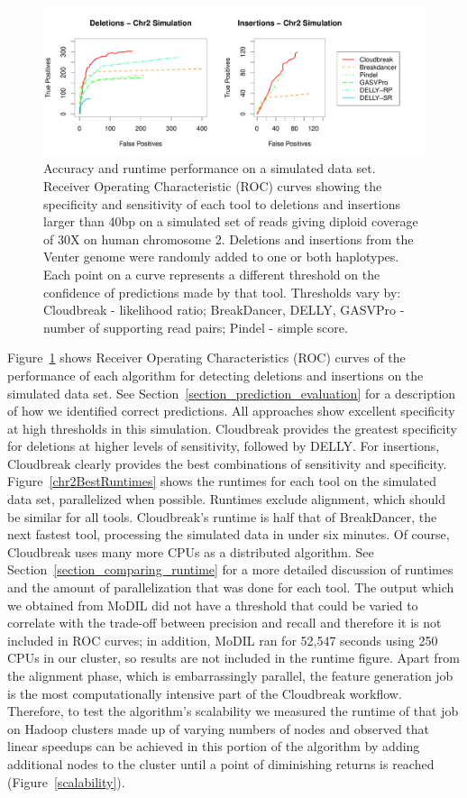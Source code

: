 \begin{figure}
\centering
\includegraphics[width=1\textwidth]{figures/CHR2SIM_ROC_COMBINED_ROCS_POSTER.pdf}
\caption{Accuracy and runtime performance on a simulated data set. Receiver Operating Characteristic (ROC) curves showing the specificity and sensitivity of each tool to deletions and insertions larger than 40bp on a simulated set of reads giving diploid coverage of 30X on human chromosome 2. Deletions and insertions from the Venter genome were randomly added to one or both haplotypes. Each point on a curve represents a different threshold on the confidence of predictions made by that tool. Thresholds vary by: Cloudbreak - likelihood ratio; BreakDancer, DELLY, GASVPro - number of supporting read pairs; Pindel - simple score.}
\label{chr2CombinedRoc}
\end{figure}

Figure~\ref{chr2CombinedRoc} shows Receiver Operating Characteristics (ROC) curves of the performance of each algorithm for detecting deletions and insertions on the simulated data set. See Section~\ref{section_prediction_evaluation} for a description of how we identified correct predictions. All approaches show excellent specificity at high thresholds in this simulation. Cloudbreak provides the greatest specificity for deletions at higher levels of sensitivity, followed by DELLY. For insertions, Cloudbreak clearly provides the best combinations of sensitivity and specificity. Figure~\ref{chr2BestRuntimes} shows the runtimes for each tool on the simulated data set, parallelized when possible. Runtimes exclude alignment, which should be similar for all tools. Cloudbreak's runtime is half that of BreakDancer, the next fastest tool, processing the simulated data in under six minutes. Of course, Cloudbreak uses many more CPUs as a distributed algorithm. See Section~\ref{section_comparing_runtime} for a more detailed discussion of runtimes and the amount of parallelization that was done for each tool. The output which we obtained from MoDIL did not have a threshold that could be varied to correlate with the trade-off between precision and recall and therefore it is not included in ROC curves; in addition, MoDIL ran for 52,547 seconds using 250 CPUs in our cluster, so results are not included in the runtime figure. Apart from the alignment phase, which is embarrassingly parallel, the feature generation job is the most computationally intensive part of the Cloudbreak workflow. Therefore, to test the algorithm's scalability we measured the runtime of that job on Hadoop clusters made up of varying numbers of nodes and observed that linear speedups can be achieved in this portion of the algorithm by adding additional nodes to the cluster until a point of diminishing returns is reached (Figure~\ref{scalability}).

